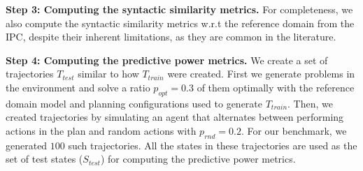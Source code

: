 \documentclass[letterpaper]{article} %
\newcommand{\T}{T}
\newcommand{\Ttrain}{\T_{\textit{train}}}
\newcommand{\Ttest}{\T_{\textit{test}}}
\newcommand{\miniparagraph}[1]{\textbf{#1.}}
\newcommand{\stest}{\ensuremath{S_{\textit{test}}}\xspace}
\newcommand{\ptest}{\ensuremath{\Pi_{\textit{test}}}\xspace}
\newif\ifaddcomments
\newcommand{\roni}[1]{\ifaddcomments{\textcolor{red}{[Roni: #1]}}\fi}
\newcommand{\mauro}[1]{\ifaddcomments{\textcolor{green}{[Mauro: #1]}}\fi}
\newcommand{\leo}[1]{\ifaddcomments{\textcolor{pink}{[Leonardo: #1]}}\fi}
\begin{document}
\miniparagraph{Step 3: Computing the syntactic similarity metrics}
For completeness, we also compute the syntactic similarity metrics w.r.t the reference domain from the IPC, despite their inherent limitations, as they are common in the literature. 



\miniparagraph{Step 4: Computing the predictive power metrics}
We create a set of trajectories $\Ttest$ similar to how $\Ttrain$ were created. First we generate problems in the environment and solve a ratio $p_{opt}=0.3$ of them optimally with the reference domain model and planning configurations used to generate $\Ttrain$. 
Then, we created trajectories by simulating an agent that alternates between performing actions in the plan and random actions with $p_{rnd}=0.2$. For our benchmark, we generated $100$ such trajectories. 
All the states in these trajectories are used as the set of test states ($\stest$) for computing the predictive power metrics. 
\end{document}
